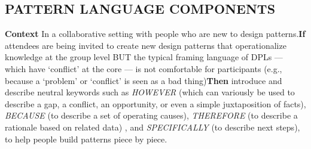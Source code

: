 \subsection*{PATTERN LANGUAGE COMPONENTS {\hfill \cognitive}}

\textbf{Context} In a collaborative setting with people who are new to
design patterns.\newline \textbf{If} attendees are being invited to
create new design patterns that operationalize knowledge at the group
level BUT the typical framing language of DPLs — which have ‘conflict’
at the core — is not comfortable for participants (e.g., because a
‘problem’ or ‘conflict’ is seen as a bad thing)\newline \textbf{Then}
introduce and describe neutral keywords such as \emph{HOWEVER} (which
can variously be used to describe a gap, a conflict, an opportunity,
or even a simple juxtaposition of facts), \emph{BECAUSE} (to describe
a set of operating causes), \emph{THEREFORE} (to describe a rationale
based on related data) , and \emph{SPECIFICALLY} (to describe next
steps), to help people build patterns piece by piece.
